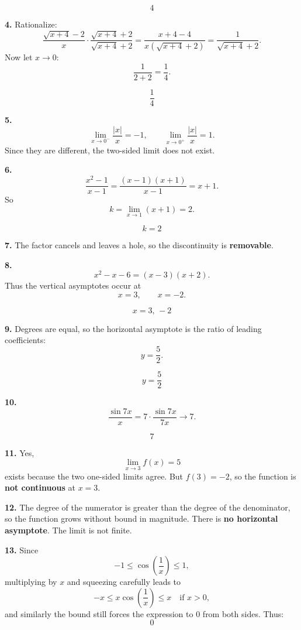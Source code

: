 \documentclass[11pt]{article}
\begin{document}
\[
\boxed{4}
\]

\bigskip

\textbf{4.}
Rationalize:
\[
\frac{\sqrt{x+4}-2}{x}\cdot \frac{\sqrt{x+4}+2}{\sqrt{x+4}+2}
=
\frac{x+4-4}{x(\sqrt{x+4}+2)}
=
\frac{1}{\sqrt{x+4}+2}.
\]
Now let $x\to 0$:
\[
\frac{1}{2+2}=\frac14.
\]

\[
\boxed{\frac14}
\]

\bigskip

\textbf{5.}
\[
\lim_{x\to 0^-}\frac{|x|}{x}=-1,
\qquad
\lim_{x\to 0^+}\frac{|x|}{x}=1.
\]
Since they are different, the two-sided limit does not exist.

\bigskip

\textbf{6.}
\[
\frac{x^2-1}{x-1}=\frac{(x-1)(x+1)}{x-1}=x+1.
\]
So
\[
k=\lim_{x\to 1}(x+1)=2.
\]

\[
\boxed{k=2}
\]

\bigskip

\textbf{7.}
The factor cancels and leaves a hole, so the discontinuity is \textbf{removable}.

\bigskip

\textbf{8.}
\[
x^2-x-6=(x-3)(x+2).
\]
Thus the vertical asymptotes occur at
\[
x=3,\qquad x=-2.
\]

\[
\boxed{x=3,\,-2}
\]

\bigskip

\textbf{9.}
Degrees are equal, so the horizontal asymptote is the ratio of leading coefficients:
\[
y=\frac52.
\]

\[
\boxed{y=\frac52}
\]

\bigskip

\textbf{10.}
\[
\frac{\sin 7x}{x}
=
7\cdot\frac{\sin 7x}{7x}\to 7.
\]

\[
\boxed{7}
\]

\bigskip

\textbf{11.}
Yes,
\[
\lim_{x\to 3}f(x)=5
\]
exists because the two one-sided limits agree. But $f(3)=-2$, so the function is \textbf{not continuous} at $x=3$.

\bigskip

\textbf{12.}
The degree of the numerator is greater than the degree of the denominator, so the function grows without bound in magnitude. There is \textbf{no horizontal asymptote}. The limit is not finite.

\bigskip

\textbf{13.}
Since
\[
-1\le \cos\left(\frac1x\right)\le 1,
\]
multiplying by $x$ and squeezing carefully leads to
\[
-x\le x\cos\left(\frac1x\right)\le x
\quad\text{if }x>0,
\]
and similarly the bound still forces the expression to $0$ from both sides. Thus:
\[
\boxed{0}
\]
\end{document}
